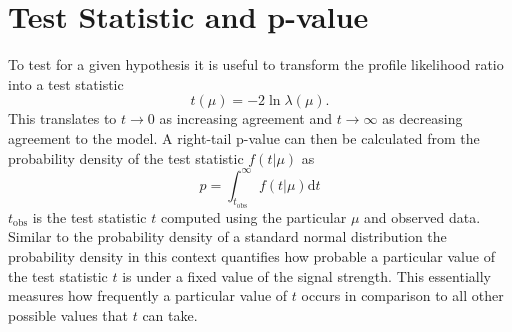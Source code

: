 \section{Test Statistic and p-value}
To test for a given hypothesis it is useful to transform the profile likelihood ratio into a test statistic
\begin{equation}
    t(\mu)=-2\ln \lambda(\mu).
\end{equation}
This translates to $t \rightarrow 0$ as increasing agreement and $t \rightarrow \infty$ as decreasing agreement to the model. A right-tail p-value can then be calculated from the probability density of the test statistic $f(t | \mu)$ as
\begin{equation}\label{eq:p-value}
    p= \int_{t_\text{obs}}^{\infty}
    f(t | \mu) \mathrm{d}t
\end{equation}
$t_\text{obs}$ is the test statistic $t$ computed using the particular $\mu$ and observed data. Similar to the probability density of a standard normal distribution the probability density in this context quantifies how probable a particular value of the test statistic $t$ is under a fixed value of the signal strength. This essentially measures how frequently a particular value of $t$ occurs in comparison to all other possible values that $t$ can take.

